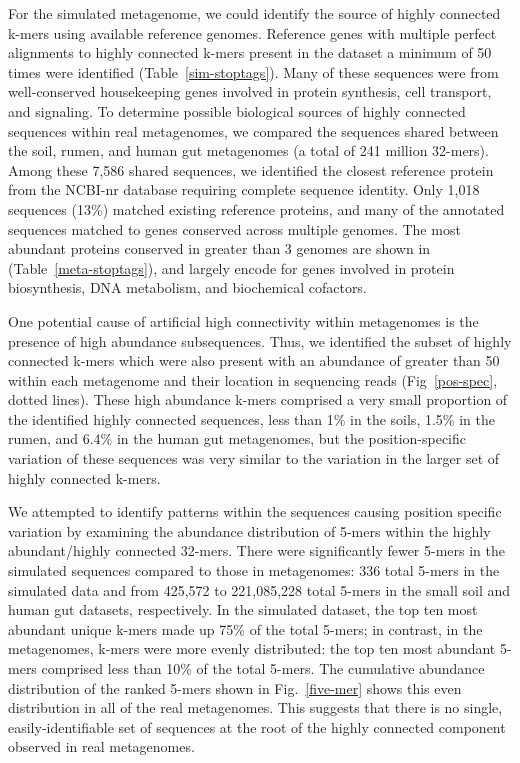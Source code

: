 \documentclass[10pt]{article}
\begin{document}
For the simulated metagenome, we could identify the source of highly
connected k-mers using available reference genomes. Reference genes
with multiple perfect alignments to highly connected k-mers present in
the dataset a minimum of 50 times were identified (Table~\ref{sim-stoptags}).  Many of
these sequences were from well-conserved housekeeping genes involved
in protein synthesis, cell transport, and signaling.  To determine
possible biological sources of highly connected sequences within real
metagenomes, we compared the sequences shared between the soil, rumen,
and human gut metagenomes (a total of 241 million 32-mers).  Among these 7,586 shared sequences, we identified the closest reference
protein from the NCBI-nr database requiring complete sequence
identity.  Only 1,018 sequences (13\%) matched existing reference
proteins, and many of the annotated sequences matched to
genes conserved across multiple genomes.  The most abundant
proteins conserved in greater than 3 genomes are shown in (Table~\ref{meta-stoptags}), and
largely encode for genes involved in protein biosynthesis, DNA
metabolism, and biochemical cofactors.

One potential cause of artificial high connectivity within metagenomes
is the presence of high abundance subsequences.  Thus, we identified the
subset of highly connected k-mers which were also present with an
abundance of greater than 50 within each metagenome and their location
in sequencing reads (Fig~\ref{pos-spec}, dotted lines).  These high abundance
k-mers comprised a very small proportion of the identified highly
connected sequences, less than 1\% in the soils, 1.5\% in the rumen,
and 6.4\% in the human gut metagenomes, but the position-specific
variation of these sequences was very similar to the variation in the
larger set of highly connected k-mers.

We attempted to identify patterns within the sequences causing
position specific variation by examining the abundance distribution of
5-mers within the highly abundant/highly connected 32-mers.  There
were significantly fewer 5-mers in the simulated sequences compared to
those in metagenomes: 336 total 5-mers in the simulated data and from
425,572 to 221,085,228 total 5-mers in the small soil and human gut
datasets, respectively.  In the simulated dataset, the top ten most
abundant unique k-mers made up 75\% of the total 5-mers; in contrast,
in the metagenomes, k-mers were more evenly distributed: the top ten
most abundant 5-mers comprised less than 10\% of the total 5-mers.
The cumulative abundance distribution of the ranked 5-mers shown in
Fig.~\ref{five-mer} shows this even distribution in all of the real metagenomes.
This suggests that there is no single, easily-identifiable set of
sequences at the root of the highly connected component observed in
real metagenomes.
\end{document}
